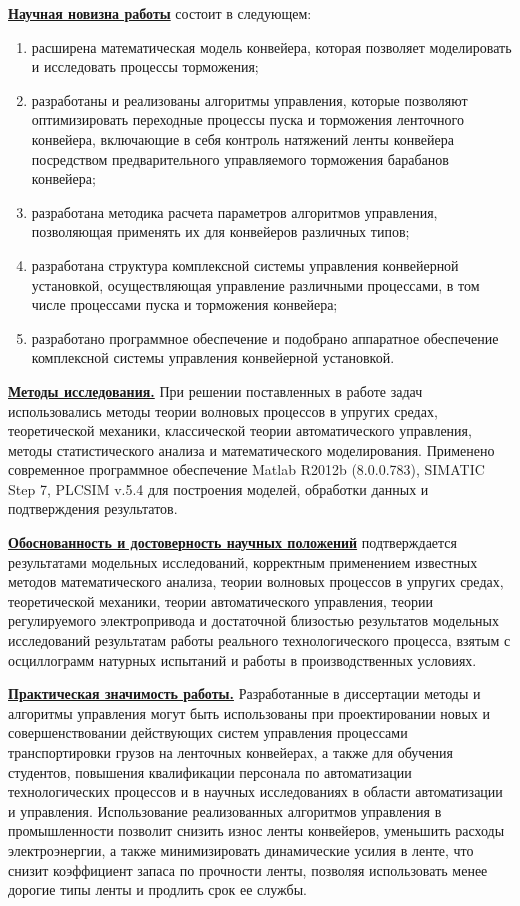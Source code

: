 \underline{\textbf{Научная новизна работы}} состоит в следующем:
\begin{enumerate}
	\item расширена математическая модель конвейера, которая позволяет моделировать и исследовать процессы торможения;
	\item разработаны и реализованы алгоритмы управления, которые позволяют оптимизировать переходные процессы пуска и торможения ленточного конвейера, включающие в себя контроль натяжений ленты конвейера посредством предварительного управляемого торможения барабанов конвейера;
	\item разработана методика расчета параметров алгоритмов управления, позволяющая применять их для конвейеров различных типов;
	\item разработана структура комплексной системы управления конвейерной установкой, осуществляющая управление различными процессами, в том числе процессами пуска и торможения конвейера;
	\item разработано программное обеспечение и подобрано аппаратное обеспечение комплексной системы управления конвейерной установкой.
\end{enumerate}
\bigskip

\underline{\textbf{Методы исследования.}} При решении поставленных в работе задач использовались методы теории волновых процессов в упругих средах, теоретической механики, классической теории автоматического управления, методы статистического анализа и математического моделирования. Применено современное программное обеспечение Matlab R2012b (8.0.0.783), SIMATIC Step 7, PLCSIM v.5.4 для построения моделей, обработки данных и подтверждения результатов.
\bigskip

\underline{\textbf{Обоснованность и достоверность научных положений}} подтверждается результатами модельных исследований, корректным применением известных методов математического анализа, теории волновых процессов в упругих средах, теоретической механики, теории автоматического управления, теории регулируемого электропривода и достаточной близостью результатов модельных исследований результатам работы реального технологического процесса, взятым с осциллограмм натурных испытаний и работы в производственных условиях.
\bigskip

\underline{\textbf{Практическая значимость работы.}} Разработанные в диссертации методы и алгоритмы управления могут быть использованы при проектировании новых и совершенствовании действующих систем управления процессами транспортировки грузов на ленточных конвейерах, а также для обучения студентов, повышения квалификации персонала по автоматизации технологических процессов и в научных исследованиях в области автоматизации и управления. Использование реализованных алгоритмов управления в промышленности позволит снизить износ ленты конвейеров, уменьшить расходы электроэнергии, а также минимизировать динамические усилия в ленте, что снизит коэффициент запаса по прочности ленты, позволяя использовать менее дорогие типы ленты и продлить срок ее службы.
\bigskip

